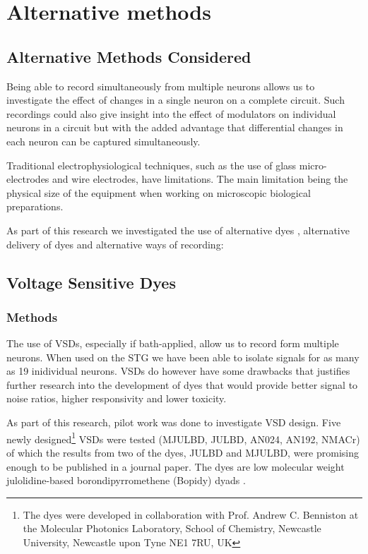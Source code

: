 \chapter{Alternative methods}
\label{chap:alternative}
\section{Alternative Methods Considered}
\label{sec:alternative}
Being able to record simultaneously from multiple neurons allows us to investigate the effect of changes in a single neuron on a complete circuit. Such recordings could also give insight into the effect of modulators on individual neurons in a circuit but with the added advantage that differential changes in each neuron can be captured simultaneously.

Traditional electrophysiological techniques, such as the use of glass micro-electrodes and wire electrodes, have limitations. The main limitation being the physical size of the equipment when working on microscopic biological preparations.

As part of this research we investigated the use of alternative dyes , alternative delivery of dyes and alternative ways of recording:

\section{Voltage Sensitive Dyes}
\subsection{Methods}
\label{sec:alternative_vsd}
The use of \acp{VSD}, especially if bath-applied, allow us to record form multiple neurons. When used on the \ac{STG} we have been able to isolate signals for as many as 19 inidividual neurons. \acp{VSD} do however have some drawbacks that justifies further research into the development of dyes that would provide better signal to noise ratios, higher responsivity and lower toxicity.

As part of this research, pilot work was done to investigate \ac{VSD} design. Five newly designed\footnote{The dyes were developed in collaboration with Prof. Andrew C. Benniston at the Molecular Photonics Laboratory, School of Chemistry, Newcastle University, Newcastle upon Tyne NE1 7RU, UK} \acp{VSD} were tested (MJULBD, JULBD, AN024, AN192, NMACr) of which the results from two of the dyes, JULBD and MJULBD, were promising enough to be published in a journal paper. The dyes are low molecular weight julolidine-based borondipyrromethene (Bopidy) dyads \cite{Bai2014}. 


